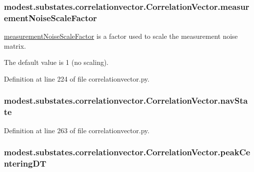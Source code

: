 \subsubsection[{\texorpdfstring{measurement\+Noise\+Scale\+Factor}{measurementNoiseScaleFactor}}]{\setlength{\rightskip}{0pt plus 5cm}modest.\+substates.\+correlationvector.\+Correlation\+Vector.\+measurement\+Noise\+Scale\+Factor}\hypertarget{classmodest_1_1substates_1_1correlationvector_1_1CorrelationVector_ae1c71753aea17170b58bd9fabc62c037}{}\label{classmodest_1_1substates_1_1correlationvector_1_1CorrelationVector_ae1c71753aea17170b58bd9fabc62c037}


\hyperlink{classmodest_1_1substates_1_1correlationvector_1_1CorrelationVector_ae1c71753aea17170b58bd9fabc62c037}{measurement\+Noise\+Scale\+Factor} is a factor used to scale the measurement noise matrix. 

The default value is 1 (no scaling). 

Definition at line 224 of file correlationvector.\+py.

\subsubsection[{\texorpdfstring{nav\+State}{navState}}]{\setlength{\rightskip}{0pt plus 5cm}modest.\+substates.\+correlationvector.\+Correlation\+Vector.\+nav\+State}\hypertarget{classmodest_1_1substates_1_1correlationvector_1_1CorrelationVector_a29c9276a6e6569fc4a48270f05138148}{}\label{classmodest_1_1substates_1_1correlationvector_1_1CorrelationVector_a29c9276a6e6569fc4a48270f05138148}


Definition at line 263 of file correlationvector.\+py.

\subsubsection[{\texorpdfstring{peak\+Centering\+DT}{peakCenteringDT}}]{\setlength{\rightskip}{0pt plus 5cm}modest.\+substates.\+correlationvector.\+Correlation\+Vector.\+peak\+Centering\+DT}\hypertarget{classmodest_1_1substates_1_1correlationvector_1_1CorrelationVector_ae9ff77b4328fa9f8d258264e7489457d}{}\label{classmodest_1_1substates_1_1correlationvector_1_1CorrelationVector_ae9ff77b4328fa9f8d258264e7489457d}



